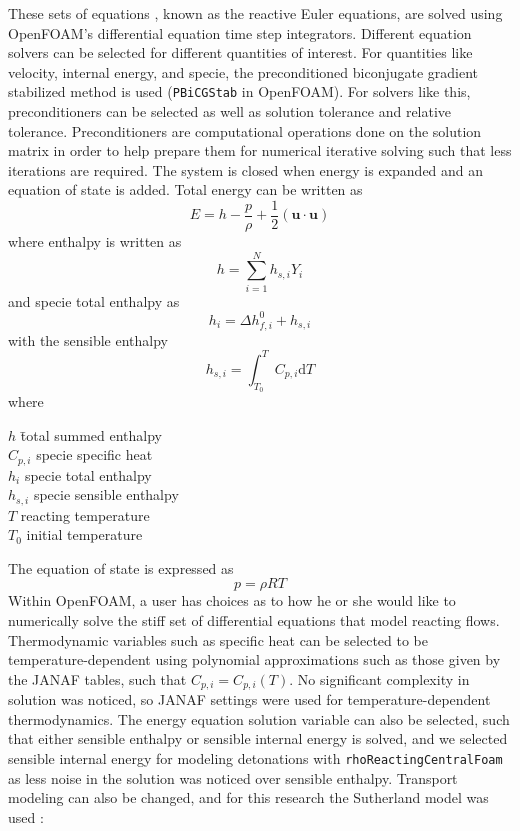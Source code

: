 \noindent These sets of equations \cite{kuo}, known as the reactive Euler equations, are solved using OpenFOAM's differential equation time step integrators. Different equation solvers can be selected for different quantities of interest. For quantities like velocity, internal energy, and specie, the preconditioned biconjugate gradient stabilized method is used (\verb|PBiCGStab| in OpenFOAM). For solvers like this, preconditioners can be selected as well as solution tolerance and relative tolerance. Preconditioners are computational operations done on the solution matrix in order to help prepare them for numerical iterative solving such that less iterations are required. The system is closed when energy is expanded and an equation of state is added. Total energy \cite{kuo} can be written as 
\begin{equation}
E = h - \frac{p}{\rho} +\frac{1}{2} \left(\bm{u}\cdot\bm{u}\right)
\end{equation}
where enthalpy is written \cite{kuo} as 
\begin{equation}
h = \sum_{i = 1}^Nh_{s,i}Y_i
\end{equation}
and specie total enthalpy \cite{kuo} as 
\begin{equation}
h_{i} = \Delta h_{f,i}^0 + h_{s,i}
\end{equation}
with the sensible enthalpy 
\begin{equation}
h_{s,i} = \int_{T_0}^T C_{p,i}\mathrm{d}T
\end{equation}
where 
\begin{tabbing}
\qquad \= \(h\) \qquad \= total summed enthalpy\\ 
\> \(C_{p,i}\) \> specie specific heat\\
\> \(h_i\) \> specie total enthalpy \\
\> \(h_{s,i}\) \> specie sensible enthalpy \\
\> \(T\) \> reacting temperature \\
\> \(T_0\) \> initial temperature 
\end{tabbing}
The equation of state is expressed as 
\begin{equation}
p = \rho R T
\end{equation}
Within OpenFOAM, a user has choices as to how he or she would like to numerically solve the stiff set of differential equations that model reacting flows. Thermodynamic variables such as specific heat can be selected to be temperature-dependent using polynomial approximations such as those given by the JANAF tables, such that \(C_{p,i} = C_{p,i}(T)\). No significant complexity in solution was noticed, so JANAF settings were used for temperature-dependent thermodynamics. The energy equation solution variable can also be selected, such that either sensible enthalpy or sensible internal energy is solved, and we selected sensible internal energy for modeling detonations with \verb|rhoReactingCentralFoam| as less noise in the solution was noticed over sensible enthalpy. Transport modeling can also be changed, and for this research the Sutherland model was used \cite{ofug}:
